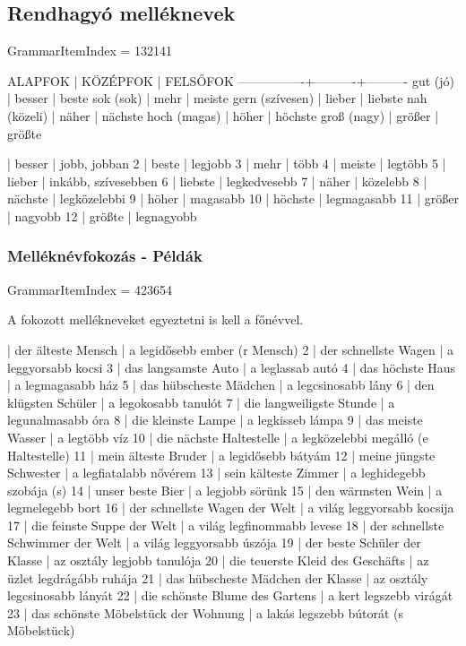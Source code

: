 \documentclass{article}
\newenvironment{desc}{\verbatim}{\endverbatim}
\newenvironment{exmp}{\verbatim}{\endverbatim}
\begin{document}
\subsection{Rendhagyó melléknevek}

GrammarItemIndex = 132141

\begin{desc}
ALAPFOK         | KÖZÉPFOK | FELSŐFOK
----------------+----------+----------
gut (jó)        | besser   | beste
sok (sok)       | mehr     | meiste
gern (szívesen) | lieber   | liebste
nah (közeli)    | näher    | nächste
hoch (magas)    | höher    | höchste
groß (nagy)     | größer   | größte
\end{desc}

\begin{exmp}
1 | besser | jobb, jobban
2 | beste | legjobb
3 | mehr | több
4 | meiste | legtöbb
5 | lieber | inkább, szívesebben
6 | liebste | legkedvesebb
7 | näher | közelebb
8 | nächste | legközelebbi
9 | höher | magasabb
10 | höchste | legmagasabb
11 | größer | nagyobb
12 | größte | legnagyobb
\end{exmp}

\subsubsection{Melléknévfokozás - Példák}

GrammarItemIndex = 423654

\begin{desc}
A fokozott mellékneveket egyeztetni is kell a főnévvel.
\end{desc}

\begin{exmp}
1 | der älteste Mensch | a legidősebb ember (r Mensch)
2 | der schnellste Wagen | a leggyorsabb kocsi
3 | das langsamste Auto | a leglassab autó
4 | das höchste Haus | a legmagasabb ház
5 | das hübscheste Mädchen | a legcsinosabb lány
6 | den klügsten Schüler | a legokosabb tanulót
7 | die langweiligste Stunde | a legunalmasabb óra
8 | die kleinste Lampe | a legkisseb lámpa
9 | das meiste Wasser | a legtöbb víz
10 | die nächste Haltestelle | a legközelebbi megálló (e Haltestelle)
11 | mein älteste Bruder | a legidősebb bátyám
12 | meine jüngste Schwester | a legfiatalabb nővérem
13 | sein kälteste Zimmer | a leghidegebb szobája (s)
14 | unser beste Bier | a legjobb sörünk
15 | den wärmsten Wein | a legmelegebb bort
16 | der schnellste Wagen der Welt | a világ leggyorsabb kocsija
17 | die feinste Suppe der Welt | a világ legfinommabb levese
18 | der schnellste Schwimmer der Welt | a világ leggyorsabb úszója
19 | der beste Schüler der Klasse | az osztály legjobb tanulója
20 | die teuerste Kleid des Geschäfts | az üzlet legdrágább ruhája
21 | das hübscheste Mädchen der Klasse | az osztály legcsinosabb lányát
22 | die schönste Blume des Gartens | a kert legszebb virágát
23 | das schönste Möbelstück der Wohnung | a lakás legszebb bútorát (s Möbelstück)
\end{exmp}
\end{document}
